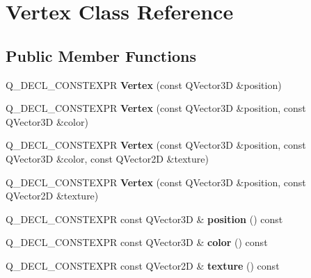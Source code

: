 \hypertarget{class_vertex}{}\section{Vertex Class Reference}
\label{class_vertex}
\subsection*{Public Member Functions}
\begin{DoxyCompactItemize}
\item 
Q\+\_\+\+D\+E\+C\+L\+\_\+\+C\+O\+N\+S\+T\+E\+X\+PR {\bfseries Vertex} (const Q\+Vector3D \&position)\hypertarget{class_vertex_abd9662d85a8594ea74d2b349286498da}{}\label{class_vertex_abd9662d85a8594ea74d2b349286498da}

\item 
Q\+\_\+\+D\+E\+C\+L\+\_\+\+C\+O\+N\+S\+T\+E\+X\+PR {\bfseries Vertex} (const Q\+Vector3D \&position, const Q\+Vector3D \&color)\hypertarget{class_vertex_a6ed0ae9e821c3cdcf4ae7700872c913e}{}\label{class_vertex_a6ed0ae9e821c3cdcf4ae7700872c913e}

\item 
Q\+\_\+\+D\+E\+C\+L\+\_\+\+C\+O\+N\+S\+T\+E\+X\+PR {\bfseries Vertex} (const Q\+Vector3D \&position, const Q\+Vector3D \&color, const Q\+Vector2D \&texture)\hypertarget{class_vertex_a2dfd1e43381dccaa3f60db17e4caa72c}{}\label{class_vertex_a2dfd1e43381dccaa3f60db17e4caa72c}

\item 
Q\+\_\+\+D\+E\+C\+L\+\_\+\+C\+O\+N\+S\+T\+E\+X\+PR {\bfseries Vertex} (const Q\+Vector3D \&position, const Q\+Vector2D \&texture)\hypertarget{class_vertex_ab6aaabdf2577376106efc7cc111dce54}{}\label{class_vertex_ab6aaabdf2577376106efc7cc111dce54}

\item 
Q\+\_\+\+D\+E\+C\+L\+\_\+\+C\+O\+N\+S\+T\+E\+X\+PR const Q\+Vector3D \& {\bfseries position} () const \hypertarget{class_vertex_a5cc133b4fcf419eab539b95b4e713d42}{}\label{class_vertex_a5cc133b4fcf419eab539b95b4e713d42}

\item 
Q\+\_\+\+D\+E\+C\+L\+\_\+\+C\+O\+N\+S\+T\+E\+X\+PR const Q\+Vector3D \& {\bfseries color} () const \hypertarget{class_vertex_aa482d7c9ff336901c987723b9e0ec4b5}{}\label{class_vertex_aa482d7c9ff336901c987723b9e0ec4b5}

\item 
Q\+\_\+\+D\+E\+C\+L\+\_\+\+C\+O\+N\+S\+T\+E\+X\+PR const Q\+Vector2D \& {\bfseries texture} () const \hypertarget{class_vertex_a0f424ff1645823896371b155822d91d7}{}\label{class_vertex_a0f424ff1645823896371b155822d91d7}


\end{DoxyCompactItemize}
